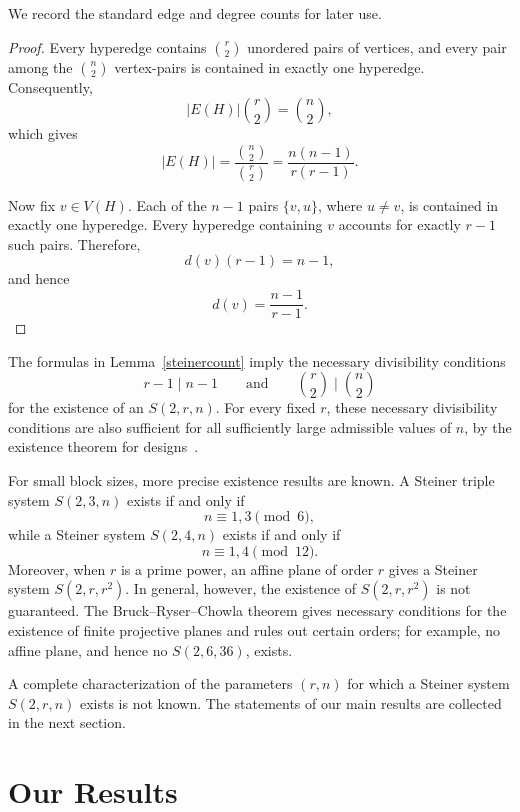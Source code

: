 \documentclass[11pt,a4paper]{article}
\newtheorem{lemma}[theorem]{Lemma}
\theoremstyle{definition}
\theoremstyle{remark}
\begin{document}
We record the standard edge and degree counts for later use.


\begin{proof}
Every hyperedge contains \(\binom{r}{2}\) unordered pairs of vertices,
and every pair among the \(\binom{n}{2}\) vertex-pairs is contained in
exactly one hyperedge. Consequently,
$$
|E(H)|\binom{r}{2}
=
\binom{n}{2},
$$
which gives
$$
|E(H)|
=
\frac{\binom{n}{2}}{\binom{r}{2}}
=
\frac{n(n-1)}{r(r-1)}.
$$

Now fix \(v\in V(H)\). Each of the \(n-1\) pairs
\(\{v,u\}\), where \(u\neq v\), is contained in exactly one
hyperedge. Every hyperedge containing \(v\) accounts for exactly
\(r-1\) such pairs. Therefore,
$$
d(v)(r-1)=n-1,
$$
and hence
$$
d(v)=\frac{n-1}{r-1}.
$$
\end{proof}

The formulas in Lemma~\ref{steinercount} imply the necessary
divisibility conditions
$$
r-1\mid n-1
\qquad\text{and}\qquad
\binom{r}{2}\mid\binom{n}{2}
$$
for the existence of an \(S(2,r,n)\). For every fixed \(r\), these
necessary divisibility conditions are also sufficient for all
sufficiently large admissible values of \(n\), by the existence theorem
for designs~\cite{keevash2014existence}.

For small block sizes, more precise existence results are known. A
Steiner triple system \(S(2,3,n)\) exists if and only if
$$
n\equiv 1,3\pmod 6,
$$
while a Steiner system \(S(2,4,n)\) exists if and only if
$$
n\equiv 1,4\pmod{12}.
$$
Moreover, when \(r\) is a prime power, an affine plane of order \(r\)
gives a Steiner system \(S(2,r,r^2)\). In general, however, the
existence of \(S(2,r,r^2)\) is not guaranteed. The
Bruck--Ryser--Chowla theorem
\cite{bruck1949nonexistence,chowla1950combinatorial} gives necessary
conditions for the existence of finite projective planes and rules out
certain orders; for example, no affine plane, and hence no
\(S(2,6,36)\), exists.

A complete characterization of the parameters \((r,n)\) for which a
Steiner system \(S(2,r,n)\) exists is not known. The statements of our
main results are collected in the next section.
\section{Our Results}
\label{sec:our-results}
\end{document}
